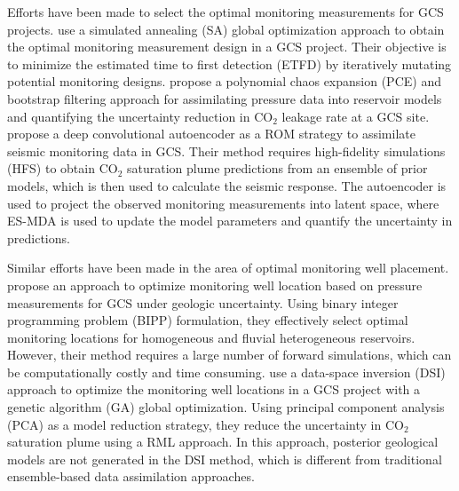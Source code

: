 \documentclass[a4paper,fleqn]{cas-sc}
\begin{document}
Efforts have been made to select the optimal monitoring measurements for GCS projects. \citet{Yonkofski2016} use a simulated annealing (SA) global optimization approach to obtain the optimal monitoring measurement design in a GCS project. Their objective is to minimize the estimated time to first detection (ETFD) by iteratively mutating potential monitoring designs. \citet{Oladyshkin2013671} propose a polynomial chaos expansion (PCE) and bootstrap filtering approach for assimilating pressure data into reservoir models and quantifying the uncertainty reduction in CO$_2$ leakage rate at a GCS site. \citet{Liu2020} propose a deep convolutional autoencoder as a ROM strategy to assimilate seismic monitoring data in GCS. Their method requires high-fidelity simulations (HFS) to obtain CO$_2$ saturation plume predictions from an ensemble of prior models, which is then used to calculate the seismic response. The autoencoder is used to project the observed monitoring measurements into latent space, where ES-MDA is used to update the model parameters and quantify the uncertainty in predictions. 

Similar efforts have been made in the area of optimal monitoring well placement. \citet{Sun2013} propose an approach to optimize monitoring well location based on pressure measurements for GCS under geologic uncertainty. Using binary integer programming problem (BIPP) formulation, they effectively select optimal monitoring locations for homogeneous and fluvial heterogeneous reservoirs. However, their method requires a large number of forward simulations, which can be computationally costly and time consuming. \citet{Sun2019} use a data-space inversion (DSI) approach to optimize the monitoring well locations in a GCS project with a genetic algorithm (GA) global optimization. Using principal component analysis (PCA) as a model reduction strategy, they reduce the uncertainty in CO$_2$ saturation plume using a RML approach. In this approach, posterior geological models are not generated in the DSI method, which is different from traditional ensemble-based data assimilation approaches. 
\end{document}
